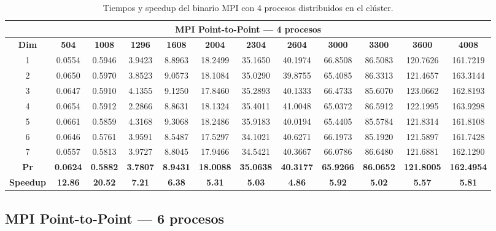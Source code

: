 \documentclass{article}
\begin{document}
\begin{table}[H]
\centering
\tiny
\begin{tabular}{|c|c|c|c|c|c|c|c|c|c|c|c|}
\hline
\multicolumn{12}{|c|}{\textbf{MPI Point-to-Point --- 4 procesos}} \\
\hline
\textbf{Dim} & \textbf{504} & \textbf{1008} & \textbf{1296} & \textbf{1608} & \textbf{2004} & \textbf{2304} & \textbf{2604} & \textbf{3000} & \textbf{3300} & \textbf{3600} & \textbf{4008} \\
\hline
1 & 0.0554 & 0.5946 & 3.9423 & 8.8963 & 18.2499 & 35.1650 & 40.1974 & 66.8508 & 86.5083 & 120.7626 & 161.7219 \\
2 & 0.0650 & 0.5970 & 3.8523 & 9.0573 & 18.1084 & 35.0290 & 39.8755 & 65.4085 & 86.3313 & 121.4657 & 163.3144 \\
3 & 0.0647 & 0.5910 & 4.1355 & 9.1250 & 17.8460 & 35.2893 & 40.1333 & 66.4733 & 85.6070 & 123.0662 & 162.8193 \\
4 & 0.0654 & 0.5912 & 2.2866 & 8.8631 & 18.1324 & 35.4011 & 41.0048 & 65.0372 & 86.5912 & 122.1995 & 163.9298 \\
5 & 0.0661 & 0.5859 & 4.3168 & 9.3068 & 18.2486 & 35.9183 & 40.0194 & 65.4405 & 85.5784 & 121.8314 & 161.8108 \\
6 & 0.0646 & 0.5761 & 3.9591 & 8.5487 & 17.5297 & 34.1021 & 40.6271 & 66.1973 & 85.1920 & 121.5897 & 161.7428 \\
7 & 0.0557 & 0.5813 & 3.9727 & 8.8045 & 17.9466 & 34.5421 & 40.3667 & 66.0786 & 86.6480 & 121.6881 & 162.1290 \\
\hline
\textbf{Pr} & \textbf{0.0624} & \textbf{0.5882} & \textbf{3.7807} & \textbf{8.9431} & \textbf{18.0088} & \textbf{35.0638} & \textbf{40.3177} & \textbf{65.9266} & \textbf{86.0652} & \textbf{121.8005} & \textbf{162.4954} \\
\hline
\textbf{Speedup} & \textbf{12.86} & \textbf{20.52} & \textbf{7.21} & \textbf{6.38} & \textbf{5.31} & \textbf{5.03} & \textbf{4.86} & \textbf{5.92} & \textbf{5.02} & \textbf{5.57} & \textbf{5.81} \\
\hline
\end{tabular}
\caption{Tiempos y speedup del binario MPI con 4 procesos distribuidos en el clúster.}
\label{tab:p2p4}
\end{table}

\subsection{MPI Point-to-Point --- 6 procesos}
\end{document}
